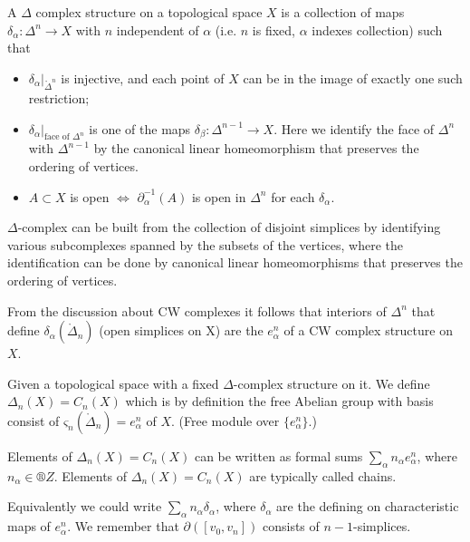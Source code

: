 \documentclass[12pt]{article}					%
\begin{document}
\begin{definice}
	A $Δ$ complex structure on a topological space $X$ is a collection of maps $δ_α: Δ^n \rightarrow X$ with $n$ independent of $α$ (i.e. $n$ is fixed, $α$ indexes collection) such that
	\begin{itemize}
		\item $δ_α |_{\mathring Δ^n}$ is injective, and each point of $X$ can be in the image of exactly one such restriction;
		\item $δ_α |_{\text{face of $Δ^n$}}$ is one of the maps $δ_β: Δ^{n - 1} \rightarrow X$. Here we identify the face of $Δ^n$ with $Δ^{n-1}$ by the canonical linear homeomorphism that preserves the ordering of vertices.
		\item $A \subset X$ is open $\Leftrightarrow$ $\partial_α^{-1}(A)$ is open in $Δ^n$ for each $δ_α$.
	\end{itemize}

	\begin{poznamkain}
		$Δ$-complex can be built from the collection of disjoint simplices by identifying various subcomplexes spanned by the subsets of the vertices, where the identification can be done by canonical linear homeomorphisms that preserves the ordering of vertices.

		From the discussion about CW complexes it follows that interiors of $Δ^n$ that define $δ_α(\mathring Δ_n)$ (open simplices on X) are the $e_α^n$ of a CW complex structure on $X$.
	\end{poznamkain}
\end{definice}

\begin{definice}
	Given a topological space with a fixed $Δ$-complex structure on it. We define $Δ_n(X) = C_n(X)$ which is by definition the free Abelian group with basis consist of $ς_n(\mathring Δ_n) = e_α^n$ of $X$. (Free module over $\{e_α^n\}$.)

	\begin{poznamkain}
		Elements of $Δ_n(X) = C_n(X)$ can be written as formal sums $\sum_α n_α e_α^n$, where $n_α \in ®Z$. Elements of $Δ_n(X) = C_n(X)$ are typically called chains.

		Equivalently we could write $\sum_α n_α δ_α$, where $δ_α$ are the defining on characteristic maps of $e_α^n$. We remember that $\partial([v_0, v_n])$ consists of $n-1$-simplices.
	\end{poznamkain}
\end{definice}
\end{document}
